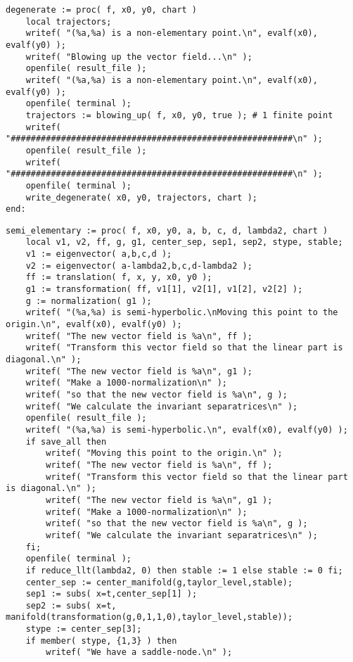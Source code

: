 \documentclass[a4paper,10pt]{article}
\begin{document}
\begin{lstlisting}[name=type]
degenerate := proc( f, x0, y0, chart )
    local trajectors;
    writef( "(%a,%a) is a non-elementary point.\n", evalf(x0), evalf(y0) );
    writef( "Blowing up the vector field...\n" );
    openfile( result_file );
    writef( "(%a,%a) is a non-elementary point.\n", evalf(x0), evalf(y0) );
    openfile( terminal );
    trajectors := blowing_up( f, x0, y0, true ); # 1 finite point
    writef( "########################################################\n" );
    openfile( result_file );
    writef( "########################################################\n" );
    openfile( terminal );
    write_degenerate( x0, y0, trajectors, chart );
end:
\end{lstlisting}

\begin{lstlisting}[name=type]
semi_elementary := proc( f, x0, y0, a, b, c, d, lambda2, chart )
    local v1, v2, ff, g, g1, center_sep, sep1, sep2, stype, stable;
    v1 := eigenvector( a,b,c,d );
    v2 := eigenvector( a-lambda2,b,c,d-lambda2 );
    ff := translation( f, x, y, x0, y0 );
    g1 := transformation( ff, v1[1], v2[1], v1[2], v2[2] );
    g := normalization( g1 );
    writef( "(%a,%a) is semi-hyperbolic.\nMoving this point to the origin.\n", evalf(x0), evalf(y0) );
    writef( "The new vector field is %a\n", ff );
    writef( "Transform this vector field so that the linear part is diagonal.\n" );
    writef( "The new vector field is %a\n", g1 );
    writef( "Make a 1000-normalization\n" );
    writef( "so that the new vector field is %a\n", g );
    writef( "We calculate the invariant separatrices\n" );
    openfile( result_file );
    writef( "(%a,%a) is semi-hyperbolic.\n", evalf(x0), evalf(y0) );
    if save_all then
        writef( "Moving this point to the origin.\n" );
        writef( "The new vector field is %a\n", ff );
        writef( "Transform this vector field so that the linear part is diagonal.\n" );
        writef( "The new vector field is %a\n", g1 );
        writef( "Make a 1000-normalization\n" );
        writef( "so that the new vector field is %a\n", g );
        writef( "We calculate the invariant separatrices\n" );
    fi;
    openfile( terminal );
    if reduce_llt(lambda2, 0) then stable := 1 else stable := 0 fi;
    center_sep := center_manifold(g,taylor_level,stable);
    sep1 := subs( x=t,center_sep[1] );
    sep2 := subs( x=t, manifold(transformation(g,0,1,1,0),taylor_level,stable));
    stype := center_sep[3];
    if member( stype, {1,3} ) then
        writef( "We have a saddle-node.\n" );

\end{lstlisting}
\end{document}
